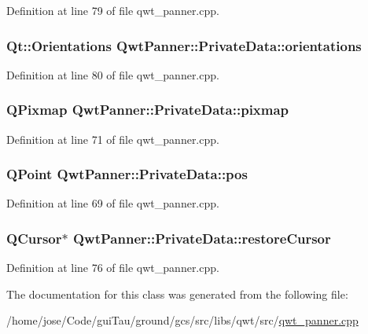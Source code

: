 Definition at line 79 of file qwt\-\_\-panner.\-cpp.

\hypertarget{class_qwt_panner_1_1_private_data_a1144c44ccc130527f57f2e6aa7e022e1}{
\subsubsection[{orientations}]{\setlength{\rightskip}{0pt plus 5cm}Qt\-::\-Orientations Qwt\-Panner\-::\-Private\-Data\-::orientations}}\label{class_qwt_panner_1_1_private_data_a1144c44ccc130527f57f2e6aa7e022e1}


Definition at line 80 of file qwt\-\_\-panner.\-cpp.

\hypertarget{class_qwt_panner_1_1_private_data_ae8f0aab7d4396ae08d02d766f8d71409}{
\subsubsection[{pixmap}]{\setlength{\rightskip}{0pt plus 5cm}Q\-Pixmap Qwt\-Panner\-::\-Private\-Data\-::pixmap}}\label{class_qwt_panner_1_1_private_data_ae8f0aab7d4396ae08d02d766f8d71409}


Definition at line 71 of file qwt\-\_\-panner.\-cpp.

\hypertarget{class_qwt_panner_1_1_private_data_a61ffc8ce3105d412d4e7b6791720246f}{
\subsubsection[{pos}]{\setlength{\rightskip}{0pt plus 5cm}Q\-Point Qwt\-Panner\-::\-Private\-Data\-::pos}}\label{class_qwt_panner_1_1_private_data_a61ffc8ce3105d412d4e7b6791720246f}


Definition at line 69 of file qwt\-\_\-panner.\-cpp.

\hypertarget{class_qwt_panner_1_1_private_data_a5a37eb3f45a9e887ed24a6d2654069d6}{
\subsubsection[{restore\-Cursor}]{\setlength{\rightskip}{0pt plus 5cm}Q\-Cursor$\ast$ Qwt\-Panner\-::\-Private\-Data\-::restore\-Cursor}}\label{class_qwt_panner_1_1_private_data_a5a37eb3f45a9e887ed24a6d2654069d6}


Definition at line 76 of file qwt\-\_\-panner.\-cpp.



The documentation for this class was generated from the following file\-:\begin{DoxyCompactItemize}
\item 
/home/jose/\-Code/gui\-Tau/ground/gcs/src/libs/qwt/src/\hyperlink{qwt__panner_8cpp}{qwt\-\_\-panner.\-cpp}\end{DoxyCompactItemize}
